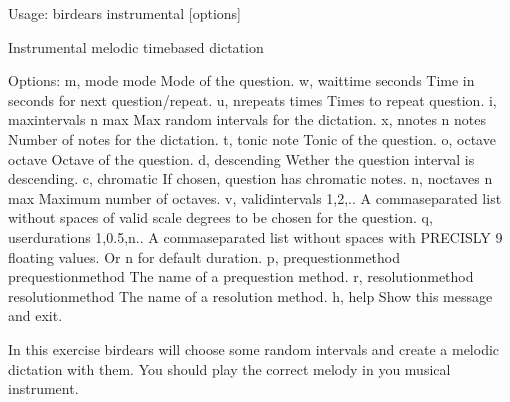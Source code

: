 \documentclass[letterpaper,10pt,english]{sphinxmanual}
\begin{document}
%
\begin{sphinxVerbatim}[commandchars=\\\{\}]
Usage: birdears instrumental [options]

  Instrumental melodic time\PYGZhy{}based dictation

Options:
  \PYGZhy{}m, \PYGZhy{}\PYGZhy{}mode \PYGZlt{}mode\PYGZgt{}               Mode of the question.
  \PYGZhy{}w, \PYGZhy{}\PYGZhy{}wait\PYGZus{}time \PYGZlt{}seconds\PYGZgt{}       Time in seconds for next question/repeat.
  \PYGZhy{}u, \PYGZhy{}\PYGZhy{}n\PYGZus{}repeats \PYGZlt{}times\PYGZgt{}         Times to repeat question.
  \PYGZhy{}i, \PYGZhy{}\PYGZhy{}max\PYGZus{}intervals \PYGZlt{}n max\PYGZgt{}     Max random intervals for the dictation.
  \PYGZhy{}x, \PYGZhy{}\PYGZhy{}n\PYGZus{}notes \PYGZlt{}n notes\PYGZgt{}         Number of notes for the dictation.
  \PYGZhy{}t, \PYGZhy{}\PYGZhy{}tonic \PYGZlt{}note\PYGZgt{}              Tonic of the question.
  \PYGZhy{}o, \PYGZhy{}\PYGZhy{}octave \PYGZlt{}octave\PYGZgt{}           Octave of the question.
  \PYGZhy{}d, \PYGZhy{}\PYGZhy{}descending                Wether the question interval is descending.
  \PYGZhy{}c, \PYGZhy{}\PYGZhy{}chromatic                 If chosen, question has chromatic notes.
  \PYGZhy{}n, \PYGZhy{}\PYGZhy{}n\PYGZus{}octaves \PYGZlt{}n max\PYGZgt{}         Maximum number of octaves.
  \PYGZhy{}v, \PYGZhy{}\PYGZhy{}valid\PYGZus{}intervals \PYGZlt{}1,2,..\PYGZgt{}  A comma\PYGZhy{}separated list without spaces
                                  of valid scale degrees to be chosen for the
                                  question.
  \PYGZhy{}q, \PYGZhy{}\PYGZhy{}user\PYGZus{}durations \PYGZlt{}1,0.5,n..\PYGZgt{}
                                  A comma\PYGZhy{}separated list without
                                  spaces with PRECISLY 9 floating values. Or
                                  \PYGZsq{}n\PYGZsq{} for default              duration.
  \PYGZhy{}p, \PYGZhy{}\PYGZhy{}prequestion\PYGZus{}method \PYGZlt{}prequestion\PYGZus{}method\PYGZgt{}
                                  The name of a pre\PYGZhy{}question method.
  \PYGZhy{}r, \PYGZhy{}\PYGZhy{}resolution\PYGZus{}method \PYGZlt{}resolution\PYGZus{}method\PYGZgt{}
                                  The name of a resolution method.
  \PYGZhy{}h, \PYGZhy{}\PYGZhy{}help                      Show this message and exit.

  In this exercise birdears will choose some random intervals and create a
  melodic dictation with them. You should play the correct melody in you
  musical instrument.


\end{sphinxVerbatim}
\end{document}
